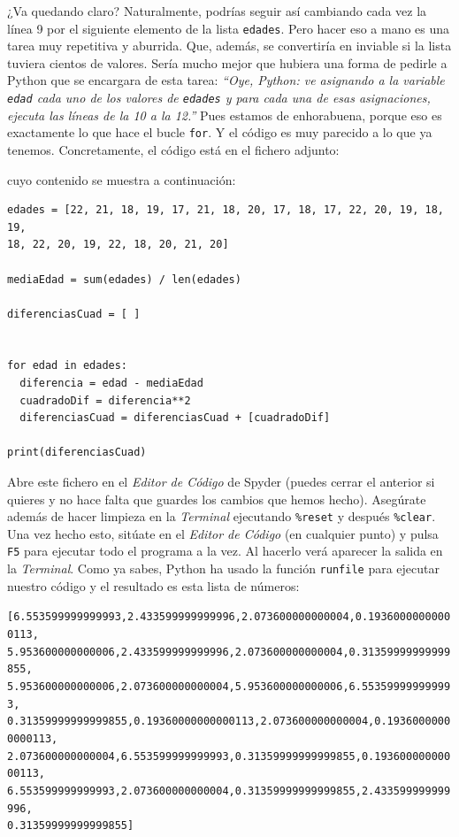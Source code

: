 \documentclass[10pt,a4paper]{article}\usepackage[]{graphicx}\usepackage[]{color}
\makeatletter
\newenvironment{kframe}{%
 \def\at@end@of@kframe{}%
 \ifinner\ifhmode%
  \def\at@end@of@kframe{\end{minipage}}%
  \begin{minipage}{\columnwidth}%
 \fi\fi%
 \def\FrameCommand##1{\hskip\@totalleftmargin \hskip-\fboxsep
 \colorbox{shadecolor}{##1}\hskip-\fboxsep
     \hskip-\linewidth \hskip-\@totalleftmargin \hskip\columnwidth}%
 \MakeFramed {\advance\hsize-\width
   \@totalleftmargin\z@ \linewidth\hsize
   \@setminipage}}%
 {\par\unskip\endMakeFramed%
 \at@end@of@kframe}
\newenvironment{knitrout}{}{} %
\newcounter {cont01}
\makeatother
\begin{document}
¿Va quedando claro? Naturalmente, podrías seguir así cambiando cada vez la línea 9 por el siguiente elemento de la lista {\tt edades}. Pero hacer eso a mano es una tarea muy repetitiva y aburrida. Que, además, se convertiría en inviable si la lista tuviera cientos de valores. Sería mucho mejor que hubiera una forma de pedirle a Python que se encargara de esta tarea: {\em ``Oye, Python: ve asignando a la variable {\tt edad} cada uno de los valores de {\tt edades} y para cada una de esas asignaciones, ejecuta las líneas de la 10 a la 12.''} Pues estamos de enhorabuena, porque eso es exactamente lo que hace el bucle {\tt for}. Y el código es muy parecido a lo que ya tenemos. Concretamente, el código está en el fichero adjunto:

\begin{center}
\end{center}
cuyo contenido se muestra a continuación:
\begin{knitrout}
\color{fgcolor}\begin{kframe}
\begin{verbatim}
edades = [22, 21, 18, 19, 17, 21, 18, 20, 17, 18, 17, 22, 20, 19, 18, 19,
18, 22, 20, 19, 22, 18, 20, 21, 20]

mediaEdad = sum(edades) / len(edades)

diferenciasCuad = [ ]


for edad in edades:
  diferencia = edad - mediaEdad
  cuadradoDif = diferencia**2
  diferenciasCuad = diferenciasCuad + [cuadradoDif]

print(diferenciasCuad)
\end{verbatim}
\end{kframe}
\end{knitrout}
Abre este fichero en el {\em Editor de Código} de Spyder (puedes cerrar el anterior si quieres y no hace falta que guardes los cambios que hemos hecho). Asegúrate además de hacer limpieza en la {\em Terminal} ejecutando \verb&%reset&
y después \verb&%clear&. 
Una vez hecho esto, sitúate en el {\em Editor de Código} (en cualquier punto) y pulsa {\tt F5} para ejecutar todo el programa a la vez. Al hacerlo verá aparecer la salida en la {\em Terminal}. Como ya sabes, Python ha usado la función {\tt runfile} para ejecutar nuestro código y el resultado es esta lista de números:
\begin{knitrout}
\color{fgcolor}\begin{kframe}
\begin{alltt}
[6.553599999999993, 2.433599999999996, 2.073600000000004, 0.19360000000000113,
 5.953600000000006, 2.433599999999996, 2.073600000000004, 0.31359999999999855,
 5.953600000000006, 2.073600000000004, 5.953600000000006, 6.553599999999993, 
 0.31359999999999855, 0.19360000000000113, 2.073600000000004, 0.19360000000000113, 
 2.073600000000004, 6.553599999999993, 0.31359999999999855, 0.19360000000000113, 
 6.553599999999993, 2.073600000000004, 0.31359999999999855, 2.433599999999996, 
 0.31359999999999855]
\end{alltt}
\end{kframe}
\end{knitrout}
\end{document}
